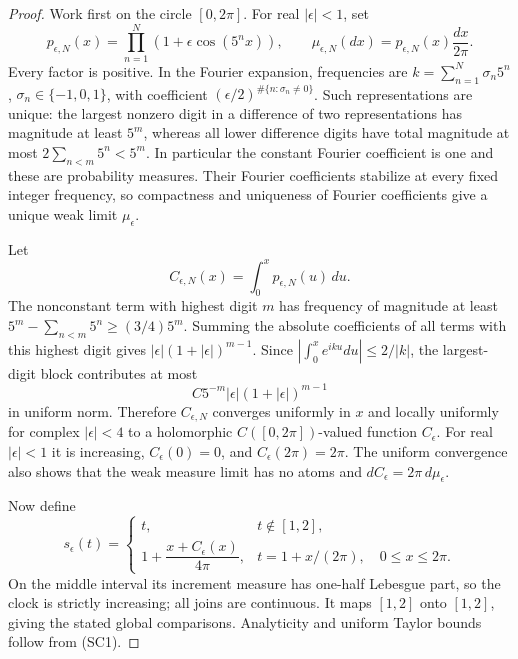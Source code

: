 \documentclass[11pt]{article}
\theoremstyle{definition}\newtheorem{definition}[theorem]{Definition}
\theoremstyle{remark}\newtheorem{remark}[theorem]{Remark}
\begin{document}
\begin{proof}
Work first on the circle $[0,2\pi]$. For real $|\epsilon|<1$, set
\[
 p_{\epsilon,N}(x)=\prod_{n=1}^N
                  (1+\epsilon\cos(5^n x)),\qquad
 \mu_{\epsilon,N}(dx)=p_{\epsilon,N}(x)\frac{dx}{2\pi}.
\]
Every factor is positive. In the Fourier expansion, frequencies are
$k=\sum_{n=1}^N\sigma_n5^n$, $\sigma_n\in\{-1,0,1\}$, with coefficient
$(\epsilon/2)^{\#\{n:\sigma_n\ne0\}}$. Such representations are unique:
the largest nonzero digit in a difference of two representations has
magnitude at least $5^m$, whereas all lower difference digits have total
magnitude at most $2\sum_{n<m}5^n<5^m$. In particular the constant
Fourier coefficient is one and these are probability measures.
Their Fourier coefficients stabilize at every fixed integer frequency,
so compactness and uniqueness of Fourier coefficients give a unique
weak limit $\mu_\epsilon$.

Let
\[
 C_{\epsilon,N}(x)=\int_0^x p_{\epsilon,N}(u)\,du.
\]
The nonconstant term with highest digit $m$ has frequency of magnitude
at least $5^m-\sum_{n<m}5^n\ge(3/4)5^m$. Summing the absolute
coefficients of all terms with this highest digit gives
$|\epsilon|(1+|\epsilon|)^{m-1}$. Since
$|\int_0^x e^{iku}du|\le2/|k|$, the largest-digit block contributes
at most
\[
 C5^{-m}|\epsilon|(1+|\epsilon|)^{m-1}
 \tag{SC1}
\]
in uniform norm. Therefore $C_{\epsilon,N}$ converges uniformly in $x$
and locally uniformly for complex $|\epsilon|<4$ to a holomorphic
$C([0,2\pi])$-valued function $C_\epsilon$. For real $|\epsilon|<1$
it is increasing, $C_\epsilon(0)=0$, and $C_\epsilon(2\pi)=2\pi$.
The uniform convergence also shows that the weak measure limit has no
atoms and $dC_\epsilon=2\pi\,d\mu_\epsilon$.

Now define
\[
 s_\epsilon(t)=
 \begin{cases}
 t,&t\notin[1,2],\\
 1+\dfrac{x+C_\epsilon(x)}{4\pi},
       &t=1+x/(2\pi),\quad0\le x\le2\pi.
 \end{cases}
 \tag{SC2}
\]
On the middle interval its increment measure has one-half Lebesgue
part, so the clock is strictly increasing; all joins are continuous.
It maps $[1,2]$ onto $[1,2]$, giving the stated global comparisons.
Analyticity and uniform Taylor bounds follow from (SC1).


\end{proof}
\end{document}
